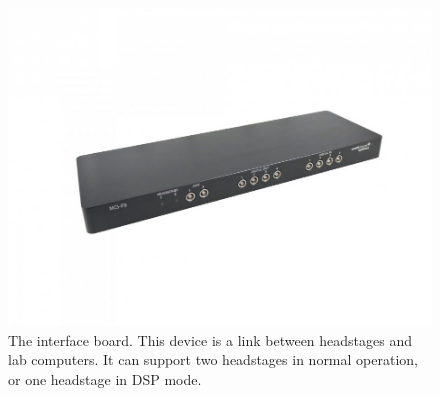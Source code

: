 \begin{figure}[h!]
    \includegraphics[width=\linewidth]{images/MCS-IFB.jpg}
    \caption{The interface board.
      This device is a link between headstages and lab computers.
    It can support two headstages in normal operation, or one headstage in DSP mode.}
    \label{fig:MCS-IFB}
\end{figure}

